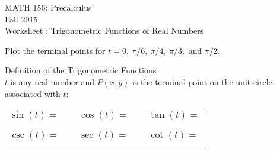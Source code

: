 \documentclass[11pt]{article}
\newcommand{\sect}{\textsection}
\begin{document}
 

\begin{center}MATH 156: Precalculus  \\ Fall 2015 \\ Worksheet \sect 5.2: Trigonometric Functions of Real Numbers\end{center}

\hrulefill

Plot the terminal points for $t=0,\: \pi/6, \: \pi/4, \: \pi/3,$ and $\pi/2.$\\


\hrulefill

Definition of the Trigonometric Functions\\

$t$ is any real number and $P(x,y)$ is the terminal point on the unit circle associated with $t:$

\begin{tabular}{lllll}
$\sin(t) =$ & \quad\quad\quad\quad& $\cos(t) =$ & \quad\quad\quad\quad &$\tan(t) =$ \\
&&&&\\
&&&&\\
$\csc(t) =$ & \quad &$\sec(t) =$ & \quad& $\cot(t) =$ \\
&&&&\\
&&&&\\
\end{tabular}

\hrulefill
\end{document}
